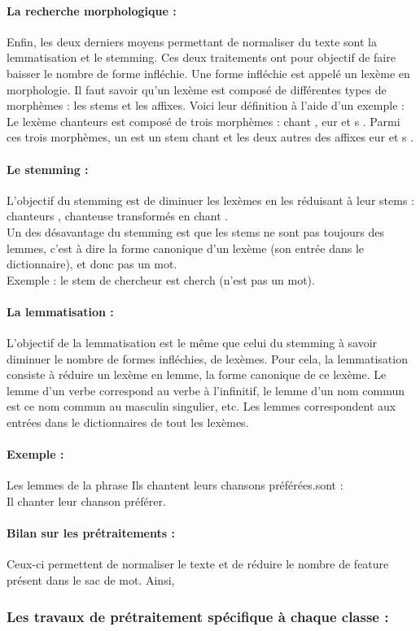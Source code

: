                \paragraph{La recherche morphologique :}
                    Enfin, les deux derniers moyens permettant de normaliser du texte sont la lemmatisation et le stemming. Ces deux traitements ont pour objectif de faire baisser le nombre de forme infléchie. Une forme infléchie est appelé un lexème en morphologie. Il faut savoir qu'un lexème est composé de différentes types de morphèmes : les stems et les affixes. Voici leur définition à l'aide d'un exemple :\\
                    Le lexème \og chanteurs \fg est composé de trois morphèmes : \og chant \fg, \og eur \fg et \og s \fg. Parmi ces trois morphèmes, un est un stem \og chant \fg et les deux autres des affixes \og eur \fg et \og s \fg.


                \paragraph{Le stemming :}
                    L'objectif du stemming est de diminuer les lexèmes en les réduisant à leur stems : \og chanteurs \fg, \og chanteuse \fg transformés en \og chant \fg.\\
                    Un des désavantage du stemming est que les stems ne sont pas toujours des lemmes, c'est à dire la forme canonique d'un lexème (son entrée dans le dictionnaire), et donc pas un mot.\\
                    Exemple : le stem de \og chercheur \fg est \og cherch \fg (n'est pas un mot).

                \paragraph{La lemmatisation :}
                    L'objectif de la lemmatisation est le même que celui du stemming à savoir diminuer le nombre de formes infléchies, de lexèmes. Pour cela, la lemmatisation consiste à réduire un lexème en lemme, la forme canonique de ce lexème. Le lemme d'un verbe correspond au verbe à l'infinitif, le lemme d'un nom commun est ce nom commun au masculin singulier, etc. Les lemmes correspondent aux entrées dans le dictionnaires de tout les lexèmes.\\

                \paragraph{Exemple :}
                    Les lemmes de la phrase \og Ils chantent leurs chansons préférées.\fg sont :\\
                     \og Il chanter leur chanson préférer. \fg

                \paragraph{Bilan sur les prétraitements :}
                    Ceux-ci permettent de normaliser le texte et de réduire le nombre de feature présent dans le sac de mot. Ainsi,



            \subsubsection{Les travaux de prétraitement spécifique à chaque classe :}